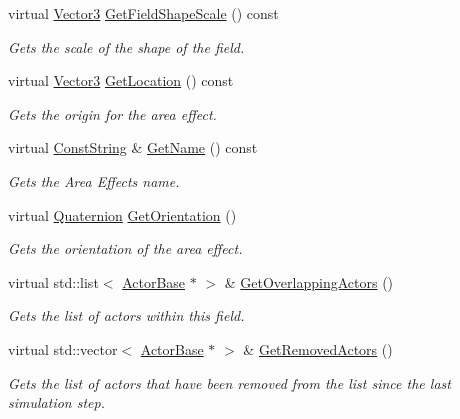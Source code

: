 \begin{DoxyCompactItemize}
virtual \hyperlink{classMezzanine_1_1Vector3}{Vector3} \hyperlink{classMezzanine_1_1AreaEffect_a7e80ddc1cb411012d80a99859bb865f7}{GetFieldShapeScale} () const 
\begin{DoxyCompactList}\small\item\em Gets the scale of the shape of the field. \item\end{DoxyCompactList}\item 
virtual \hyperlink{classMezzanine_1_1Vector3}{Vector3} \hyperlink{classMezzanine_1_1AreaEffect_a37d04f8e6d6e8451348ee60fd083968b}{GetLocation} () const 
\begin{DoxyCompactList}\small\item\em Gets the origin for the area effect. \item\end{DoxyCompactList}\item 
virtual \hyperlink{namespaceMezzanine_a63cd699ac54b73953f35ec9cfc05e506}{ConstString} \& \hyperlink{classMezzanine_1_1AreaEffect_ae0205e57786da97300357d7ac1afd180}{GetName} () const 
\begin{DoxyCompactList}\small\item\em Gets the Area Effects name. \item\end{DoxyCompactList}\item 
virtual \hyperlink{classMezzanine_1_1Quaternion}{Quaternion} \hyperlink{classMezzanine_1_1AreaEffect_a658d69036a307f232b88aafcab3d02c1}{GetOrientation} ()
\begin{DoxyCompactList}\small\item\em Gets the orientation of the area effect. \item\end{DoxyCompactList}\item 
virtual std::list$<$ \hyperlink{classMezzanine_1_1ActorBase}{ActorBase} $\ast$ $>$ \& \hyperlink{classMezzanine_1_1AreaEffect_a69f19ed2d67dca2623df6e6331b31462}{GetOverlappingActors} ()
\begin{DoxyCompactList}\small\item\em Gets the list of actors within this field. \item\end{DoxyCompactList}\item 
virtual std::vector$<$ \hyperlink{classMezzanine_1_1ActorBase}{ActorBase} $\ast$ $>$ \& \hyperlink{classMezzanine_1_1AreaEffect_ac657b565ca47198c6fd900c8a588948b}{GetRemovedActors} ()
\begin{DoxyCompactList}\small\item\em Gets the list of actors that have been removed from the list since the last simulation step. \item\end{DoxyCompactList}\item 

\end{DoxyCompactItemize}
